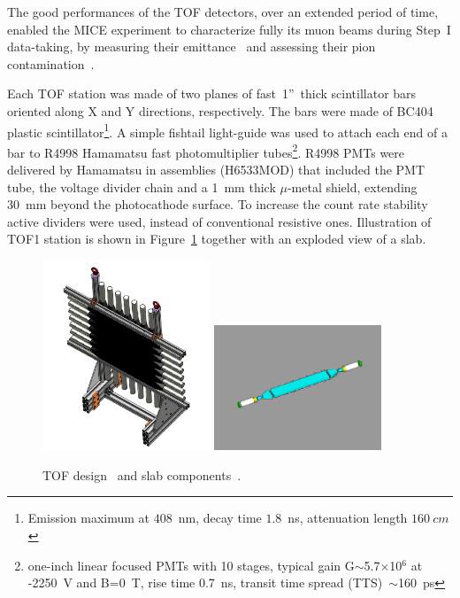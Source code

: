 The good performances of the TOF detectors, over an extended period of time,
enabled the MICE experiment to characterize fully its muon beams during
Step~I data-taking, by measuring their emittance~\cite{2013arXiv1306.1509T} and
assessing their pion contamination~\cite{2016JInst..11P3001A}.

Each TOF station was made of two planes of fast~1''~thick scintillator
bars oriented along X and Y directions, respectively. The bars were
made of BC404 plastic scintillator\footnote{Emission maximum at
  $408$~nm, decay time $1.8$~ns, attenuation length $160~cm$}. A
simple fishtail light-guide was used to attach each end of a bar to
R4998 Hamamatsu fast photomultiplier tubes\footnote{one-inch linear
  focused PMTs with 10 stages, typical gain G$\sim$5.7$\times$10$^6$
  at -2250~V and B=0~T, rise time 0.7~ns, transit time spread
  (TTS)~$\sim$160~ps}.  R4998 PMTs were delivered by Hamamatsu in
assemblies (H6533MOD) that included the PMT tube, the voltage divider
chain and a 1~mm thick $\mu$-metal shield, extending 30~mm beyond the
photocathode surface.  To increase the count rate stability active
dividers were used, instead of conventional resistive
ones. Illustration of TOF1 station is shown in
Figure~\ref{fig:tof:schematic} together with an exploded view of a
slab.

\begin{figure}[!ht]
  \centering
  \includegraphics[width=5cm]{tof_diagram}
  \includegraphics[width=5cm]{slab_design}
  \caption{TOF design~\cite{Rayner:2011zz} and slab components~\cite{NOTE241}.}
  \label{fig:tof:schematic}
\end{figure}

